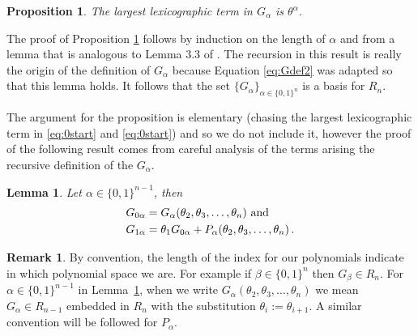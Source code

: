 \documentclass[11pt]{amsart}
\newtheorem{prop}[theorem]{Proposition}
\newtheorem{lemma}[theorem]{Lemma}
\theoremstyle{definition}
\newtheorem{remark}[theorem]{Remark}
\numberwithin{equation}{section}
\begin{document}
\begin{prop}\label{prop:largest}
The largest lexicographic term in $G_\alpha$ is $\theta^\alpha$.
\end{prop}

The proof of Proposition \ref{prop:largest} follows by induction
on the length of $\alpha$ and
from a lemma that is analogous to Lemma 3.3 of \cite{AB}.
The recursion in this result is really the origin of the definition
of $G_\alpha$ because Equation \eqref{eq:Gdef2}
was adapted so that this lemma holds.  It follows that
the set $\{ G_\alpha \}_{\alpha \in \{0,1\}^n}$ is a basis
for $R_n$.

The argument for the proposition is elementary (chasing the largest lexicographic
term in \eqref{eq:0start} and \eqref{eq:0start})
and so we do not include it, however the proof of the
following result comes from careful analysis of the
terms arising the recursive definition of the $G_\alpha$.

\begin{lemma}\label{lem:LT}
 Let $\alpha \in \{0,1\}^{n-1}$, then
\begin{align}
G_{0\alpha} &= G_\alpha(\theta_2, \theta_3, \ldots, \theta_n) \hbox{ and }\label{eq:0start}\\
G_{1\alpha} &= \theta_1 G_{0\alpha} + P_{\alpha}(\theta_2, \theta_3, \ldots, \theta_n)\,. \label{eq:1start}
\end{align}
\end{lemma}

\begin{remark}\label{rem:shift}
By convention, the length of the index for our polynomials indicate in which polynomial space we are.
For example if $\beta   \in \{0,1\}^{n}$ then $G_\beta\in R_n$. For $\alpha \in \{0,1\}^{n-1}$  in Lemma~\ref{lem:LT}, when we write
$G_\alpha(\theta_2, \theta_3, \ldots, \theta_n)$ we mean $G_\alpha\in  R_{n-1}$
embedded in $R_n$ with the substitution
$\theta_i:=\theta_{i+1}$. A similar convention will be followed for $P_\alpha$.
\end{remark}
\end{document}
